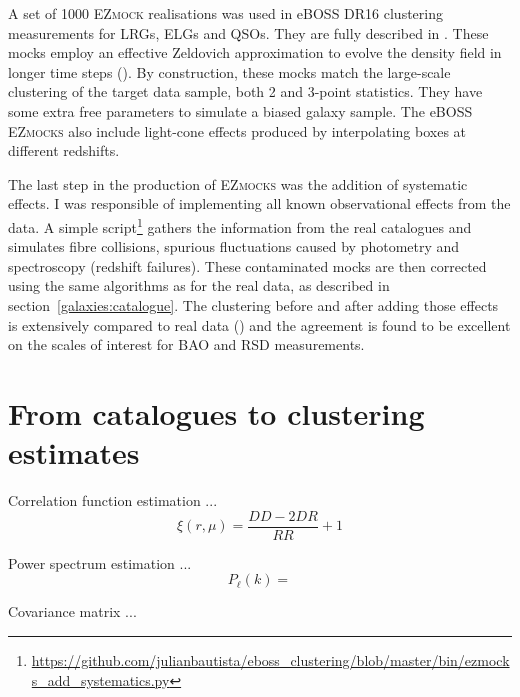 A set of 1000 \textsc{EZmock} realisations was used in eBOSS DR16 clustering measurements 
for LRGs, ELGs and QSOs. They are fully described in \cite{zhaoCompletedSDSSIVExtended2021}. 
These mocks employ an effective Zeldovich approximation to evolve 
the density field in longer time steps (\cite{chuangEZmocksExtendingZel2015}). 
By construction, these mocks match the large-scale clustering 
of the target data sample, both 2 and 3-point statistics. 
They have some extra free parameters to simulate a biased galaxy sample. 
The eBOSS \textsc{EZmocks} also include light-cone effects produced by interpolating boxes
at different redshifts. 

The last step in the production of \textsc{EZmocks} was the addition of systematic effects. 
I was responsible of implementing all known observational effects from the data. 
A simple script\footnote{\url{https://github.com/julianbautista/eboss_clustering/blob/master/bin/ezmocks_add_systematics.py}}
gathers the information from the real catalogues and simulates fibre collisions, spurious 
fluctuations caused by photometry and spectroscopy (redshift failures). 
These contaminated mocks are then corrected using the same algorithms as for the real data, 
as described in section~\ref{galaxies:catalogue}. The clustering before and after adding 
those effects is extensively compared to real data (\cite{zhaoCompletedSDSSIVExtended2021}) 
and the agreement is found to be excellent on the scales of interest for BAO and RSD measurements. 



\section{From catalogues to clustering estimates}
\label{galaxies:clustering}

Correlation function estimation ... 
\begin{equation}
 \xi(r, \mu) = \frac{DD - 2DR}{RR} + 1 
 \label{eq:landy-szalay}
\end{equation}

Power spectrum estimation ... 
\begin{equation}
 P_\ell(k) = 
\end{equation}

Covariance matrix ...  

